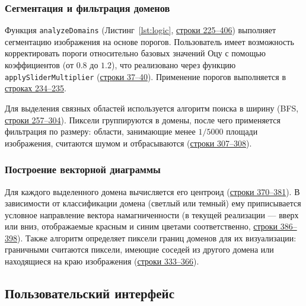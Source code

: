 \documentclass[12pt,a4paper]{article}
\numberwithin{equation}{section}
\begin{document}
\subsubsection{Сегментация и фильтрация доменов}
Функция \texttt{analyzeDomains} (Листинг~\ref{lst:logic}, \hyperref[logic:analyze]{строки 225--406}) выполняет сегментацию изображения на основе порогов. Пользователь имеет возможность корректировать пороги относительно базовых значений Оцу с помощью коэффициентов (от $0.8$ до $1.2$), что реализовано через функцию \texttt{applySliderMultiplier} (\hyperref[logic:slider]{строки 37--40}). Применение порогов выполняется в \hyperref[logic:applythresh]{строках 234--235}.

Для выделения связных областей используется алгоритм поиска в ширину (BFS, \hyperref[logic:bfs]{строки 257--304}). Пиксели группируются в домены, после чего применяется фильтрация по размеру: области, занимающие менее $1/5000$ площади изображения, считаются шумом и отбрасываются (\hyperref[logic:filter]{строки 307--308}).

\subsubsection{Построение векторной диаграммы}
Для каждого выделенного домена вычисляется его центроид (\hyperref[logic:centroid]{строки 370--381}). В зависимости от классификации домена (светлый или темный) ему приписывается условное направление вектора намагниченности (в текущей реализации — вверх или вниз, отображаемые красным и синим цветами соответственно, \hyperref[logic:direction]{строки 386--398}). Также алгоритм определяет пиксели границ доменов для их визуализации: граничными считаются пиксели, имеющие соседей из другого домена или находящиеся на краю изображения (\hyperref[logic:boundary]{строки 333--366}).

\subsection{Пользовательский интерфейс}
\end{document}
